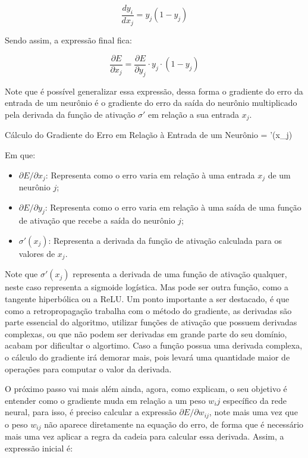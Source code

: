 \[
    \frac{d y_i}{d x_j} = y_j (1 - y_j)
\]

Sendo assim, a expressão final fica:

\[
    \frac{\partial E}{\partial x_j} = \frac{\partial E}{\partial y_j} \cdot y_j \cdot (1 - y_j)
\]

Note que é possível generalizar essa expressão, dessa forma o gradiente do erro da entrada de um neurônio é o gradiente do erro da saída do neurônio multiplicado pela derivada da função de ativação $\sigma'$ em relação a sua entrada $x_j$.

\begin{equacaodestaque}{Cálculo do Gradiente do Erro em Relação à Entrada de um Neurônio}
     =  \cdot \sigma'(x_j)
    \label{eq:gradiente-do-erro-em-relacao-a-entrada-de-um-neuronio}
\end{equacaodestaque}

Em que:

\begin{itemize}
    \item $\partial E / \partial x_j$: Representa como o erro varia em relação à uma entrada $x_j$ de um neurônio $j$;
    \item $\partial E / \partial y_j$: Representa como o erro varia em relação à uma saída de uma função de ativação que recebe a saída do neurônio $j$;
    \item $\sigma'(x_j)$: Representa a derivada da função de ativação calculada para os valores de $x_j$.
\end{itemize}

Note que $\sigma'(x_j)$ representa a derivada de uma função de ativação qualquer, neste caso representa a sigmoide logística. Mas pode ser outra função, como a tangente hiperbólica ou a ReLU. Um ponto importante a ser destacado, é que como a retropropagação trabalha com o método do gradiente, as derivadas são parte essencial do algoritmo, utilizar funções de ativação que possuem derivadas complexas, ou que não podem ser derivadas em grande parte do seu domínio, acabam por dificultar o algortimo. Caso a função possua uma derivada complexa, o cálculo do gradiente irá demorar mais, pois levará uma quantidade maior de operações para computar o valor da derivada.

O próximo passo vai mais além ainda, agora, como \textcite{BackpropagationArticle} explicam, o seu objetivo é entender como o gradiente muda em relação a um peso $w_ij$ específico da rede neural, para isso, é preciso calcular a expressão $\partial E / \partial w_{ij}$, note mais uma vez que o peso $w_{ij}$ não aparece diretamente na equação do erro, de forma que é necessário mais uma vez aplicar a regra da cadeia para calcular essa derivada. Assim, a expressão inicial é:

